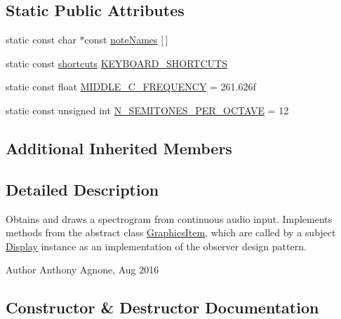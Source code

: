 \subsection*{Static Public Attributes}
\begin{DoxyCompactItemize}
\item 
static const char $\ast$const \hyperlink{structSpectrogramVisualizer_ad833647df19d8ae0eb2e47efe989d1d9}{note\+Names} \mbox{[}$\,$\mbox{]}
\item 
static const \hyperlink{structSpectrogramVisualizer_1_1shortcuts}{shortcuts} \hyperlink{structSpectrogramVisualizer_a20eb03afddbbde072d82b1efe675b0f3}{K\+E\+Y\+B\+O\+A\+R\+D\+\_\+\+S\+H\+O\+R\+T\+C\+U\+TS}
\item 
static const float \hyperlink{structSpectrogramVisualizer_adfe2ed143313d59d7c118cadec1460b9}{M\+I\+D\+D\+L\+E\+\_\+\+C\+\_\+\+F\+R\+E\+Q\+U\+E\+N\+CY} = 261.\+626f
\item 
static const unsigned int \hyperlink{structSpectrogramVisualizer_affbdeff0d7b800feb17aab0a367222da}{N\+\_\+\+S\+E\+M\+I\+T\+O\+N\+E\+S\+\_\+\+P\+E\+R\+\_\+\+O\+C\+T\+A\+VE} = 12
\end{DoxyCompactItemize}
\subsection*{Additional Inherited Members}


\subsection{Detailed Description}
Obtains and draws a spectrogram from continuous audio input. Implements methods from the abstract class \hyperlink{classGraphicsItem}{Graphics\+Item}, which are called by a subject \hyperlink{classDisplay}{Display} instance as an implementation of the observer design pattern. \begin{DoxyAuthor}{Author}
Anthony Agnone, Aug 2016 
\end{DoxyAuthor}


\subsection{Constructor \& Destructor Documentation}
\hypertarget{structSpectrogramVisualizer_a0b57309d58a075208d6c784718b3e6d7}{}\label{structSpectrogramVisualizer_a0b57309d58a075208d6c784718b3e6d7} 
